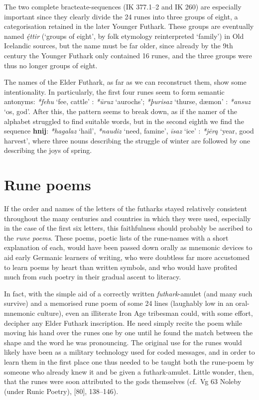 The two complete bracteate-sequences (IK 377.1--2 and IK 260) are especially important since they clearly divide the 24 runes into three groups of eight, a categorisation retained in the later Younger Futhark.  These groups are eventually named \emph{ę́ttir} (‘groups of eight’, by folk etymology reinterpreted ‘family’) in Old Icelandic sources, but the name must be far older, since already by the 9th century the Younger Futhark only contained 16 runes, and the three groups were thus no longer groups of eight.

The names of the Elder Futhark, as far as we can reconstruct them, show some intentionality.  In particularly, the first four runes seem to form semantic antonyms: \emph{*fehu} ‘fee, cattle’ : \emph{*ūruz} ‘aurochs’; \emph{*þurisaz} ‘thurse, dæmon’ : \emph{*ansuz} ‘os, god’.  After this, the pattern seems to break down, as if the namer of the alphabet struggled to find suitable words, but in the second eighth we find the sequence \textbf{hnij}: \emph{*hagalaz} ‘hail’, \emph{*naudiz} ‘need, famine’, \emph{īsaz} ‘ice’ : \emph{*jērą} ‘year, good harvest’, where three nouns describing the struggle of winter are followed by one describing the joys of spring.

\section{Rune poems}

If the order and names of the letters of the futharks stayed relatively consistent throughout the many centuries and countries in which they were used, especially in the case of the first six letters, this faithfulness should probably be ascribed to the \emph{rune poems}.  These poems, poetic lists of the rune-names with a short explanation of each, would have been passed down orally as mnemonic devices to aid early Germanic learners of writing, who were doubtless far more accustomed to learn poems by heart than written symbols, and who would have profited much from such poetry in their gradual ascent to literacy.

In fact, with the simple aid of a correctly written \emph{futhark}-amulet (and many such survive) and a memorised rune poem of some 24 lines (laughably low in an oral-mnemonic culture), even an illiterate Iron Age tribesman could, with some effort, decipher any Elder Futhark inscription.  He need simply recite the poem while moving his hand over the runes one by one until he found the match between the shape and the word he was pronouncing.  The original use for the runes would likely have been as a military technology used for coded messages, and in order to learn them in the first place one thus needed to be taught both the rune-poem by someone who already knew it and be given a futhark-amulet.  Little wonder, then, that the runes were soon attributed to the gods themselves (cf.~Vg 63 Noleby (under Runic Poetry), [80], 138--146).

